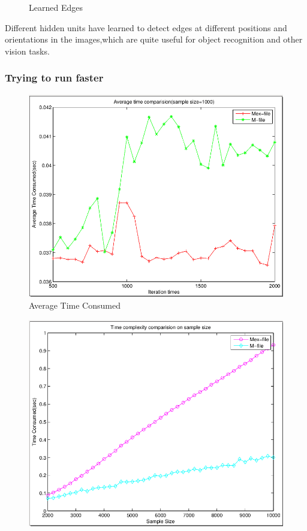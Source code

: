 \documentclass{beamer}
\begin{document}
\begin{CJK*}{UTF8}{gbsn}
\begin{frame}
\begin{minipage}{\linewidth}
\begin{minipage}{0.5\linewidth}
\begin{figure}[H]
\caption{Learned Edges}
\end{figure}
\end{minipage}
\end{minipage}
Different hidden units have learned to detect edges at different positions and orientations in the images,which are quite useful for object recognition and other vision tasks.
\end{frame}

\begin{frame}\frametitle{Trying to run faster}
\begin{minipage}{\linewidth}
\begin{minipage}{0.5\linewidth}
\begin{figure}[H]
\includegraphics[scale=0.2]{images/time_test_iter}
\caption{Average Time Consumed}
\end{figure}
\end{minipage}
\begin{minipage}{0.5\linewidth}
\begin{figure}[H]
\includegraphics[scale=0.2]{images/time_test_size}

\end{figure}
\end{minipage}
\end{minipage}
\end{frame}
\end{CJK*}
\end{document}
